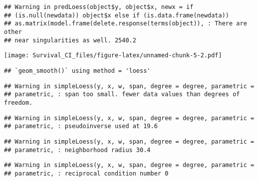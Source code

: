 \documentclass[]{article}
\newenvironment{Shaded}{\begin{snugshade}}{\end{snugshade}}
\newcommand{\KeywordTok}[1]{\textcolor[rgb]{0.13,0.29,0.53}{\textbf{{#1}}}}
\newcommand{\DataTypeTok}[1]{\textcolor[rgb]{0.13,0.29,0.53}{{#1}}}
\newcommand{\StringTok}[1]{\textcolor[rgb]{0.31,0.60,0.02}{{#1}}}
\newcommand{\CommentTok}[1]{\textcolor[rgb]{0.56,0.35,0.01}{\textit{{#1}}}}
\newcommand{\NormalTok}[1]{{#1}}
\begin{document}
\begin{verbatim}
## Warning in predLoess(object$y, object$x, newx = if
## (is.null(newdata)) object$x else if (is.data.frame(newdata))
## as.matrix(model.frame(delete.response(terms(object)), : There are other
## near singularities as well. 2540.2
\end{verbatim}

\texttt{[image: Survival\_CI\_files/figure-latex/unnamed-chunk-5-2.pdf]}

\begin{Shaded}
\end{Shaded}

\begin{verbatim}
## `geom_smooth()` using method = 'loess'
\end{verbatim}

\begin{verbatim}
## Warning in simpleLoess(y, x, w, span, degree = degree, parametric =
## parametric, : span too small. fewer data values than degrees of freedom.
\end{verbatim}

\begin{verbatim}
## Warning in simpleLoess(y, x, w, span, degree = degree, parametric =
## parametric, : pseudoinverse used at 19.6
\end{verbatim}

\begin{verbatim}
## Warning in simpleLoess(y, x, w, span, degree = degree, parametric =
## parametric, : neighborhood radius 30.4
\end{verbatim}

\begin{verbatim}
## Warning in simpleLoess(y, x, w, span, degree = degree, parametric =
## parametric, : reciprocal condition number 0
\end{verbatim}
\end{document}
